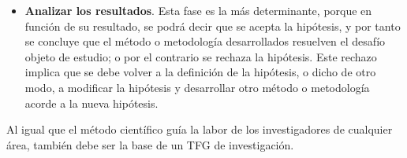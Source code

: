 \begin{itemize}
    \item \textbf{Analizar los resultados}. Esta fase es la más determinante, porque en función de su resultado, se podrá decir que se acepta la hipótesis, y por tanto se concluye que el método o metodología desarrollados resuelven el desafío objeto de estudio; o por el contrario se rechaza la hipótesis. Este rechazo implica que se debe volver a la definición de la hipótesis, o dicho de otro modo, a modificar la hipótesis y desarrollar otro método o metodología acorde a la nueva hipótesis.
\end{itemize}

Al igual que el método científico guía la labor de los investigadores de cualquier área, también debe ser la base de un TFG de investigación.



